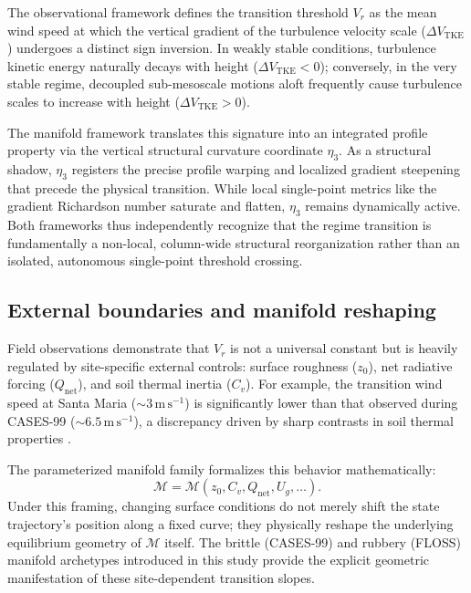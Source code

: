 \documentclass[12pt,a4paper]{article}
\begin{document}
The observational framework defines the transition threshold $V_r$ as the mean wind speed at which the vertical gradient of the turbulence velocity scale ($\Delta V_{\mathrm{TKE}}$) undergoes a distinct sign inversion. In weakly stable conditions, turbulence kinetic energy naturally decays with height ($\Delta V_{\mathrm{TKE}} < 0$); conversely, in the very stable regime, decoupled sub-mesoscale motions aloft frequently cause turbulence scales to increase with height ($\Delta V_{\mathrm{TKE}} > 0$).

The manifold framework translates this signature into an integrated profile property via the vertical structural curvature coordinate $\eta_3$. As a structural shadow, $\eta_3$ registers the precise profile warping and localized gradient steepening that precede the physical transition. While local single-point metrics like the gradient Richardson number saturate and flatten, $\eta_3$ remains dynamically active. Both frameworks thus independently recognize that the regime transition is fundamentally a non-local, column-wide structural reorganization rather than an isolated, autonomous single-point threshold crossing.

\subsection{External boundaries and manifold reshaping}

Field observations demonstrate that $V_r$ is not a universal constant but is heavily regulated by site-specific external controls: surface roughness ($z_0$), net radiative forcing ($Q_{\text{net}}$), and soil thermal inertia ($C_v$). For example, the transition wind speed at Santa Maria ($\sim 3\,\mathrm{m\,s^{-1}}$) is significantly lower than that observed during CASES-99 ($\sim 6.5\,\mathrm{m\,s^{-1}}$), a discrepancy driven by sharp contrasts in soil thermal properties \citep{acevedo2021external}.

The parameterized manifold family formalizes this behavior mathematically:
\begin{equation}
\mathcal{M} = \mathcal{M}(z_0, C_v, Q_{\text{net}}, U_g, \ldots).
\end{equation}
Under this framing, changing surface conditions do not merely shift the state trajectory's position along a fixed curve; they physically reshape the underlying equilibrium geometry of $\mathcal{M}$ itself. The brittle (CASES-99) and rubbery (FLOSS) manifold archetypes introduced in this study provide the explicit geometric manifestation of these site-dependent transition slopes.
\end{document}
